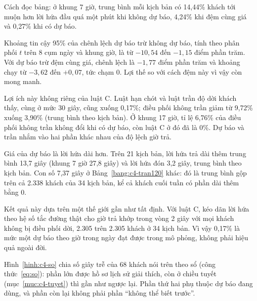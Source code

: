 Cách đọc bảng: ở khung 7 giờ, trung bình mỗi kịch bản có 14,44\% khách tới muộn hơn lời hứa đầu quá một phút khi
không dự báo, 4,24\% khi đệm cùng giá và 0,27\% khi có dự báo.

Khoảng tin cậy 95\% của chênh lệch dự báo trừ không dự báo, tính theo phân phối $t$ trên 8 cụm ngày và khung giờ, là
từ $-10{,}54$ đến $-1{,}15$ điểm phần trăm. Với dự báo trừ đệm cùng giá, chênh lệch là $-1{,}77$ điểm phần trăm và
khoảng chạy từ $-3{,}62$ đến $+0{,}07$, tức chạm 0. Lợi thế so với cách đệm này vì vậy còn mong manh.

Lợi ích này không riêng của luật C. Luật hạn chót và luật trần độ dời khách thấy, cùng ở mức 30 giây, cũng xuống
0,17\%; điều phối không trần giảm từ 9,72\% xuống 3,90\% (trung bình theo kịch bản). Ở khung 17 giờ, tỉ lệ 6,76\% của
điều phối không trần không đổi khi có dự báo, còn luật C ở đó đã là 0\%. Dự báo và trần nhắm vào hai phần khác nhau
của độ lệch giờ trả.

Giá của dự báo là lời hứa dài hơn. Trên 21 kịch bản, lời hứa trả dài thêm trung bình 13,7 giây (khung 7 giờ 27,8
giây) và lời hứa đón 3,2 giây, trung bình theo kịch bản. Con số 7,37 giây ở Bảng~\ref{bang:c4-tran120} khác: đó là
trung bình gộp trên cả 2.338 khách của 34 kịch bản, kể cả khách cuối tuần có phần dài thêm bằng 0.

Kết quả này dựa trên một thế giới gần như tất định. Với luật C, kéo dãn lời hứa theo hệ số tắc đường thật cho giờ trả
khớp trong vòng 2 giây với mọi khách không bị điều phối dời, 2.305 trên 2.305 khách ở 34 kịch bản. Vì vậy 0,17\% là
mức một dự báo theo giờ trong ngày đạt được trong mô phỏng, không phải hiệu quả ngoài đời.

Hình~\ref{hinh:c4-so} chia số giây trễ của 68 khách nói trên theo sổ (công thức~\eqref{eq:so}): phần lớn được hồ sơ
lịch sử giải thích, còn ở chiều tuyết (mục~\ref{muc:c4-tuyet}) thì gần như ngược lại. Phần thứ hai phụ thuộc dự báo
đang dùng, và phần còn lại không phải phần ``không thể biết trước''.

